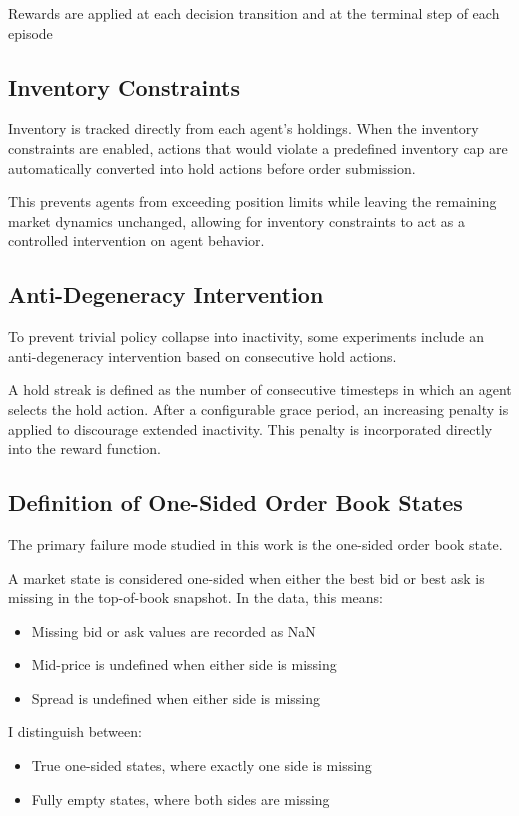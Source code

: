 \documentclass[11pt]{article}
\begin{document}
Rewards are applied at each decision transition and at the terminal step of each episode

\subsection{Inventory Constraints}

Inventory is tracked directly from each agent’s holdings. When the inventory constraints are enabled, actions that would violate a predefined inventory cap are automatically converted into hold actions before order submission.

This prevents agents from exceeding position limits while leaving the remaining market dynamics unchanged, allowing for inventory constraints to act as a controlled intervention on agent behavior.

\subsection{Anti-Degeneracy Intervention}

To prevent trivial policy collapse into inactivity, some experiments include an anti-degeneracy intervention based on consecutive hold actions.

A hold streak is defined as the number of consecutive timesteps in which an agent selects the hold action. After a configurable grace period, an increasing penalty is applied to discourage extended inactivity. This penalty is incorporated directly into the reward function.

\subsection{Definition of One-Sided Order Book States}

The primary failure mode studied in this work is the one-sided order book state.

A market state is considered one-sided when either the best bid or best ask is missing in the top-of-book snapshot. In the data, this means:
\begin{itemize}[leftmargin=2em]
    \item Missing bid or ask values are recorded as NaN
    \item Mid-price is undefined when either side is missing
    \item Spread is undefined when either side is missing
\end{itemize}

I distinguish between:
\begin{itemize}[leftmargin=2em]
    \item True one-sided states, where exactly one side is missing
    \item Fully empty states, where both sides are missing
\end{itemize}
\end{document}
